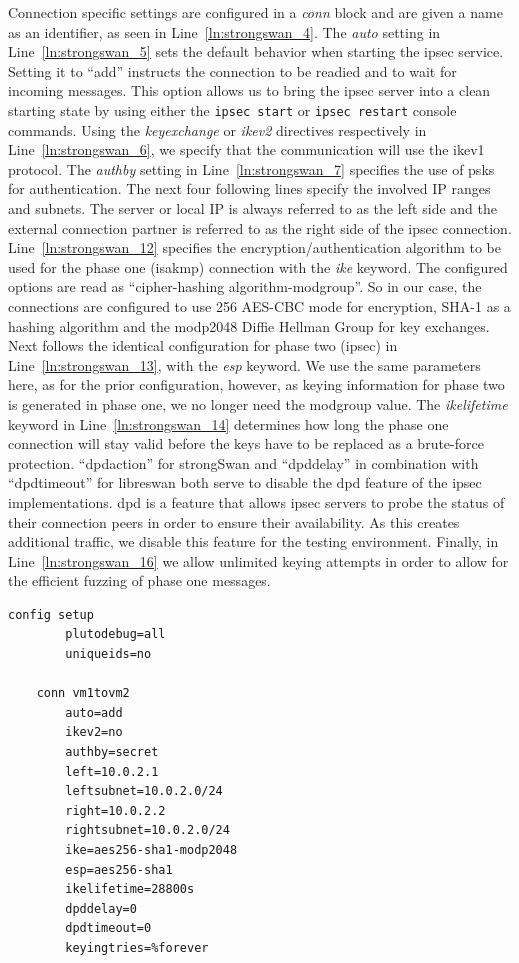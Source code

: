 Connection specific settings are configured in a \emph{conn} block and are given a name as an identifier, as seen in Line~\ref{ln:strongswan_4}. The \emph{auto} setting in Line~\ref{ln:strongswan_5} sets the default behavior when starting the \ac{ipsec} service. Setting it to ``add'' instructs the connection to be readied and to wait for incoming messages. This option allows us to bring the \ac{ipsec} server into a clean starting state by using either the \texttt{ipsec start} or \texttt{ipsec restart} console commands. Using the \emph{keyexchange} or 
\emph{ikev2} directives respectively in Line~\ref{ln:strongswan_6}, we specify that the communication will use the \ac{ike}v1 protocol. The \emph{authby} setting in Line~\ref{ln:strongswan_7} specifies the use of \acp{psk} for authentication. The next four following lines specify the involved IP ranges and subnets. The server or local IP is always referred to as the left side and the external connection partner is referred to as the right side of the \ac{ipsec} connection. Line~\ref{ln:strongswan_12} specifies the encryption/authentication algorithm to be used for the phase one (\ac{isakmp}) connection with the \emph{ike} keyword. The configured options are read as ``cipher-hashing algorithm-modgroup''. So in our case, the connections are configured to use \SI{256}{\bit} AES-CBC mode for encryption, SHA-1 as a hashing algorithm and the modp2048 Diffie Hellman Group for key exchanges. Next follows the identical configuration for phase two (\ac{ipsec}) in Line~\ref{ln:strongswan_13}, with the \emph{esp} keyword. We use the same parameters here, as for the prior configuration, however, as keying information for phase two is generated in phase one, we no longer need the modgroup value. The \emph{ikelifetime} keyword in Line~\ref{ln:strongswan_14} determines how long the phase one connection will stay valid before the keys have to be replaced as a brute-force protection. ``dpdaction'' for strongSwan and ``dpddelay'' in combination with ``dpdtimeout'' for libreswan both serve to disable the \ac{dpd} feature of the \ac{ipsec} implementations. \ac{dpd} is a feature that allows \ac{ipsec} servers to probe the status of their connection peers in order to ensure their availability. As this creates additional traffic, we disable this feature for the testing environment. Finally, in Line~\ref{ln:strongswan_16} we allow unlimited keying attempts in order to allow for the efficient fuzzing of phase one messages.

\begin{lstlisting}[mathescape=true, float=ht, caption=libreswan configuration, label=lst:libreswan_config]
	config setup
		plutodebug=all
		uniqueids=no
	
	conn vm1tovm2
		auto=add
		ikev2=no
		authby=secret
		left=10.0.2.1 
		leftsubnet=10.0.2.0/24
		right=10.0.2.2
		rightsubnet=10.0.2.0/24
		ike=aes256-sha1-modp2048
		esp=aes256-sha1
		ikelifetime=28800s
		dpddelay=0
		dpdtimeout=0
		keyingtries=%forever
\end{lstlisting}

